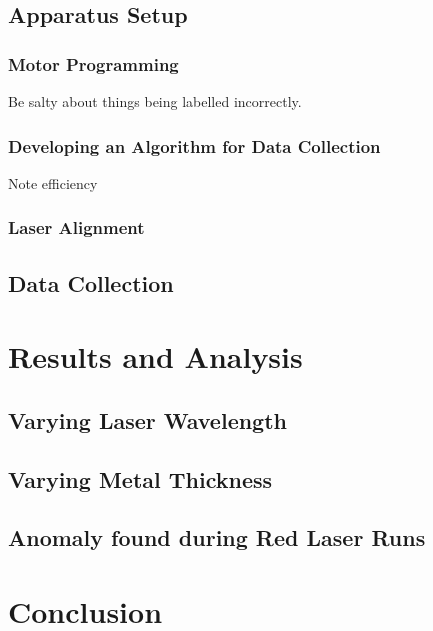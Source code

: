 \documentclass[%
reprint,
amsmath,amssymb,
aps,
]{revtex4-2}
\begin{document}
		\subsection{Apparatus Setup}
			\subsubsection{Motor Programming}
				Be salty about things being labelled incorrectly.
			
			\subsubsection{Developing an Algorithm for Data Collection}
				Note efficiency
			
			\subsubsection{Laser Alignment}
			
		\subsection{Data Collection}
			\subsubsection{}
		
		
	
	\section{Results and Analysis}
		\subsection{Varying Laser Wavelength}
		
		\subsection{Varying Metal Thickness}
	
		\subsection{Anomaly found during Red Laser Runs}

	\section{Conclusion}
		
		
	\newpage
		
	\newpage
	\appendix
		
		
\end{document}
